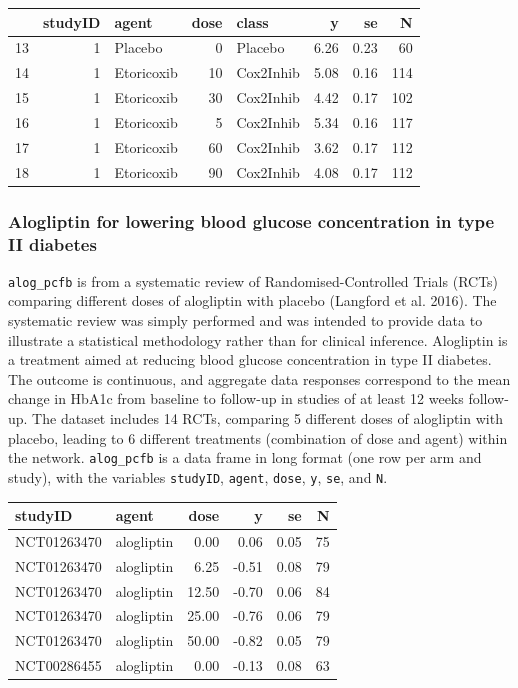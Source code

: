 \documentclass[]{article}
\begin{document}
\begin{longtable}[]{@{}lrlrlrrr@{}}
\toprule
& studyID & agent & dose & class & y & se & N\tabularnewline
\midrule
\endhead
13 & 1 & Placebo & 0 & Placebo & 6.26 & 0.23 & 60\tabularnewline
14 & 1 & Etoricoxib & 10 & Cox2Inhib & 5.08 & 0.16 & 114\tabularnewline
15 & 1 & Etoricoxib & 30 & Cox2Inhib & 4.42 & 0.17 & 102\tabularnewline
16 & 1 & Etoricoxib & 5 & Cox2Inhib & 5.34 & 0.16 & 117\tabularnewline
17 & 1 & Etoricoxib & 60 & Cox2Inhib & 3.62 & 0.17 & 112\tabularnewline
18 & 1 & Etoricoxib & 90 & Cox2Inhib & 4.08 & 0.17 & 112\tabularnewline
\bottomrule
\end{longtable}

\hypertarget{alogliptin-for-lowering-blood-glucose-concentration-in-type-ii-diabetes}{%
\subsubsection{Alogliptin for lowering blood glucose concentration in
type II
diabetes}\label{alogliptin-for-lowering-blood-glucose-concentration-in-type-ii-diabetes}}

\texttt{alog\_pcfb} is from a systematic review of Randomised-Controlled
Trials (RCTs) comparing different doses of alogliptin with placebo
(Langford et al. 2016). The systematic review was simply performed and
was intended to provide data to illustrate a statistical methodology
rather than for clinical inference. Alogliptin is a treatment aimed at
reducing blood glucose concentration in type II diabetes. The outcome is
continuous, and aggregate data responses correspond to the mean change
in HbA1c from baseline to follow-up in studies of at least 12 weeks
follow-up. The dataset includes 14 RCTs, comparing 5 different doses of
alogliptin with placebo, leading to 6 different treatments (combination
of dose and agent) within the network. \texttt{alog\_pcfb} is a data
frame in long format (one row per arm and study), with the variables
\texttt{studyID}, \texttt{agent}, \texttt{dose}, \texttt{y},
\texttt{se}, and \texttt{N}.

\begin{longtable}[]{@{}llrrrr@{}}
\toprule
studyID & agent & dose & y & se & N\tabularnewline
\midrule
\endhead
NCT01263470 & alogliptin & 0.00 & 0.06 & 0.05 & 75\tabularnewline
NCT01263470 & alogliptin & 6.25 & -0.51 & 0.08 & 79\tabularnewline
NCT01263470 & alogliptin & 12.50 & -0.70 & 0.06 & 84\tabularnewline
NCT01263470 & alogliptin & 25.00 & -0.76 & 0.06 & 79\tabularnewline
NCT01263470 & alogliptin & 50.00 & -0.82 & 0.05 & 79\tabularnewline
NCT00286455 & alogliptin & 0.00 & -0.13 & 0.08 & 63\tabularnewline
\bottomrule
\end{longtable}
\end{document}
